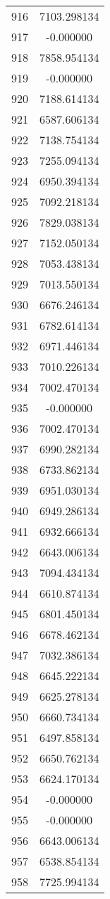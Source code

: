 \documentclass[12pt]{article}
\begin{document}
\begin{longtable}{@{}cc@{}}
916 & 7103.298134 \\
917 & -0.000000 \\
918 & 7858.954134 \\
919 & -0.000000 \\
920 & 7188.614134 \\
921 & 6587.606134 \\
922 & 7138.754134 \\
923 & 7255.094134 \\
924 & 6950.394134 \\
925 & 7092.218134 \\
926 & 7829.038134 \\
927 & 7152.050134 \\
928 & 7053.438134 \\
929 & 7013.550134 \\
930 & 6676.246134 \\
931 & 6782.614134 \\
932 & 6971.446134 \\
933 & 7010.226134 \\
934 & 7002.470134 \\
935 & -0.000000 \\
936 & 7002.470134 \\
937 & 6990.282134 \\
938 & 6733.862134 \\
939 & 6951.030134 \\
940 & 6949.286134 \\
941 & 6932.666134 \\
942 & 6643.006134 \\
943 & 7094.434134 \\
944 & 6610.874134 \\
945 & 6801.450134 \\
946 & 6678.462134 \\
947 & 7032.386134 \\
948 & 6645.222134 \\
949 & 6625.278134 \\
950 & 6660.734134 \\
951 & 6497.858134 \\
952 & 6650.762134 \\
953 & 6624.170134 \\
954 & -0.000000 \\
955 & -0.000000 \\
956 & 6643.006134 \\
957 & 6538.854134 \\
958 & 7725.994134 \\

\end{longtable}
\end{document}
